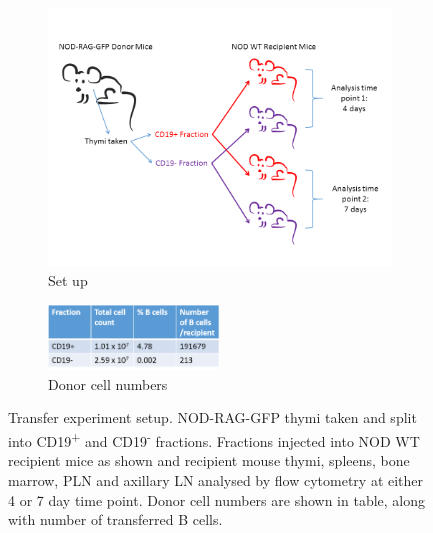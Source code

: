 \begin{figure}
\begin{subfigure}{\textwidth}
	\includegraphics[width=\textwidth]{Figures/GFPtransfersetup.png}
	\caption{Set up}
	\label{subfig:GFPtransfersetup}
	\end{subfigure}
	\begin{subfigure}{\textwidth}
	\centering
	\includegraphics[width=0.5\textwidth]{Figures/GFPdonortable2.png}
	\caption{Donor cell numbers}
	\end{subfigure}
\caption{Transfer experiment setup.
NOD-RAG-GFP thymi taken and split into CD19\textsuperscript{+} and CD19\textsuperscript{-} fractions. 
Fractions injected into NOD WT recipient mice as shown and recipient mouse thymi, spleens, bone marrow, PLN and axillary LN analysed by flow cytometry at either 4 or 7 day time point.
Donor cell numbers are shown in table, along with number of transferred B cells.}
\label{subfig:Experimentsetup}
\end{figure}


